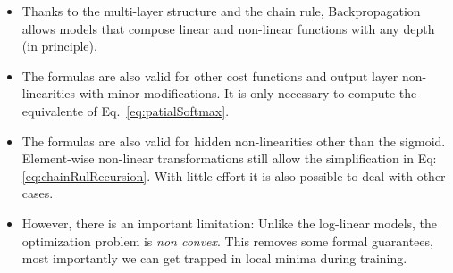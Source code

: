\begin{itemize}
\item Thanks to the multi-layer structure and the chain rule, Backpropagation allows models that compose linear and non-linear functions with any depth (in principle\footnotemark). 

\item The formulas are also valid for other cost functions and output layer non-linearities with minor modifications. It is only necessary to compute the equivalente of Eq.~\ref{eq:patialSoftmax}. 

\item The formulas are also valid for hidden non-linearities other than the sigmoid. Element-wise non-linear transformations still allow the simplification in Eq: \ref{eq:chainRulRecursion}. With little effort it is also possible to deal with other cases.

\item However, there is an important limitation: Unlike the log-linear models, the optimization problem is \textit{non convex}. This removes some formal guarantees, most importantly we can get trapped in local minima during training.
\end{itemize}


%
%
%

